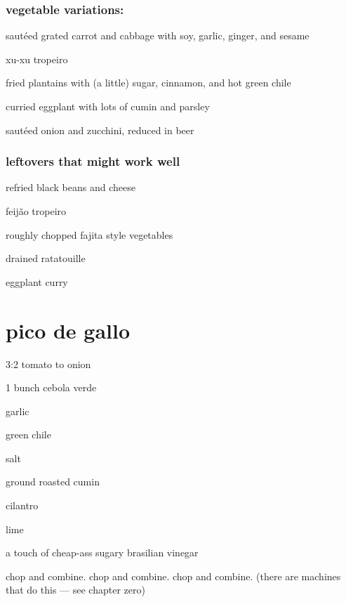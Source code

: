 \subsubsection{vegetable variations:}
\begin{ingredients}
  \item saut\'{e}ed grated carrot and cabbage with soy, garlic,
  ginger, and sesame
  \item xu-xu tropeiro
  \item fried plantains with (a little) sugar, cinnamon, and hot green
  chile
  \item curried eggplant with lots of cumin and parsley
  \item saut\'{e}ed onion and zucchini, reduced in beer
\end{ingredients}

\subsubsection{leftovers that might work well}
\begin{ingredients}
  \item refried black beans and cheese
  \item feij\~{a}o tropeiro
  \item roughly chopped fajita style vegetables
  \item drained ratatouille
  \item eggplant curry
\end{ingredients}

\section{\gls{pico de gallo}}

\begin{ingredients}
  \item 3:2 tomato to onion
  \item 1 bunch \gls{cebola verde}
  \item garlic
  \item green chile
  \item salt
  \item ground roasted cumin
  \item cilantro
  \item lime
  \item a touch of cheap-ass sugary brasilian vinegar
\end{ingredients}

chop and combine. chop and combine. chop and combine. (there are
machines that do this --- see chapter zero)

